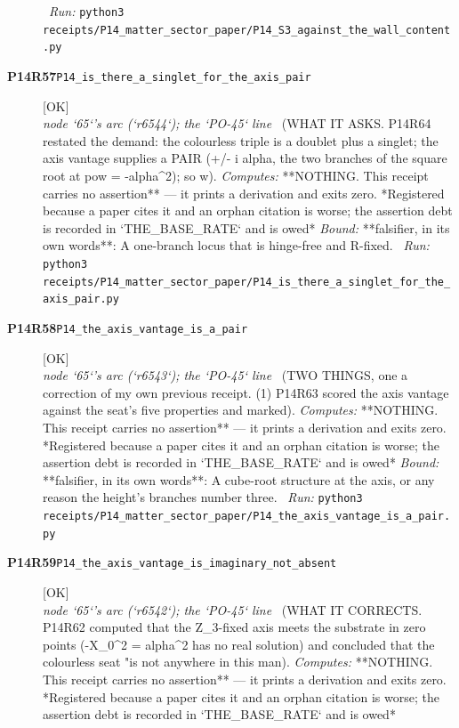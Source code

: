 \begin{description}
\ \emph{Run:} \texttt{python3 receipts/P14\_matter\_sector\_paper/P14\_S3\_against\_the\_wall\_content.py}
\item[\rcptlabel{P14_is_there_a_singlet_for_the_axis_pair}{P14R57}\textbf{P14R57}\quad\texttt{P14\_is\_there\_a\_singlet\_for\_the\_axis\_pair}]\hfill\textsf{[OK]}\\
\textit{node `65`'s arc (`r6544`); the `PO-45` line} \ (WHAT IT ASKS. P14R64 restated the demand: the colourless triple is a doublet plus a singlet; the axis vantage supplies a PAIR (+/- i alpha, the two branches of the square root at pow = -alpha\textasciicircum{}2); so w). 
\emph{Computes:}  **NOTHING. This receipt carries no assertion** --- it prints a derivation and exits zero. *Registered because a paper cites it and an orphan citation is worse; the assertion debt is recorded in `THE\_BASE\_RATE` and is owed*
 \emph{Bound:} **falsifier, in its own words**: A one-branch locus that is hinge-free and R-fixed.
\ \emph{Run:} \texttt{python3 receipts/P14\_matter\_sector\_paper/P14\_is\_there\_a\_singlet\_for\_the\_axis\_pair.py}
\item[\rcptlabel{P14_the_axis_vantage_is_a_pair}{P14R58}\textbf{P14R58}\quad\texttt{P14\_the\_axis\_vantage\_is\_a\_pair}]\hfill\textsf{[OK]}\\
\textit{node `65`'s arc (`r6543`); the `PO-45` line} \ (TWO THINGS, one a correction of my own previous receipt. (1) P14R63 scored the axis vantage against the seat's five properties and marked). 
\emph{Computes:}  **NOTHING. This receipt carries no assertion** --- it prints a derivation and exits zero. *Registered because a paper cites it and an orphan citation is worse; the assertion debt is recorded in `THE\_BASE\_RATE` and is owed*
 \emph{Bound:} **falsifier, in its own words**: A cube-root structure at the axis, or any reason the height's branches number three.
\ \emph{Run:} \texttt{python3 receipts/P14\_matter\_sector\_paper/P14\_the\_axis\_vantage\_is\_a\_pair.py}
\item[\rcptlabel{P14_the_axis_vantage_is_imaginary_not_absent}{P14R59}\textbf{P14R59}\quad\texttt{P14\_the\_axis\_vantage\_is\_imaginary\_not\_absent}]\hfill\textsf{[OK]}\\
\textit{node `65`'s arc (`r6542`); the `PO-45` line} \ (WHAT IT CORRECTS. P14R62 computed that the Z\_3-fixed axis meets the substrate in zero points (-X\_0\textasciicircum{}2 = alpha\textasciicircum{}2 has no real solution) and concluded that the colourless seat "is not anywhere in this man). 
\emph{Computes:}  **NOTHING. This receipt carries no assertion** --- it prints a derivation and exits zero. *Registered because a paper cites it and an orphan citation is worse; the assertion debt is recorded in `THE\_BASE\_RATE` and is owed*

\end{description}
